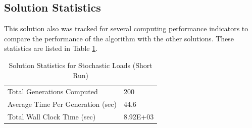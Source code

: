 \subsection{Solution Statistics}
This solution also was tracked for several computing performance indicators to compare the performance of the algorithm with the other solutions. These statistics are listed in Table \ref{tab:stat_sto_short}. 

\begin{table}[!htbp]
  \centering
  \begin{tabular}{|l|l|}
    \hline
	  Total Generations Computed & 200\\
    Average Time Per Generation (sec) & 44.6\\
    Total Wall Clock Time (sec)	 & 8.92E+03\\
    \hline
  \end{tabular}
	\caption{Solution Statistics for Stochastic Loads (Short Run)}
  \label{tab:stat_sto_short}
\end{table}
